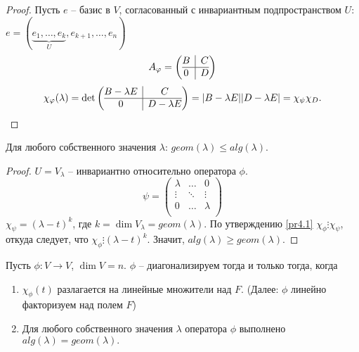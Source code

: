 \begin{proof}
    Пусть $e$ -- базис в $V$, согласованный с инвариантным подпространством $U$: 
    $e = (\underbrace{e_{1}, \dots, e_{k}}_{U}, e_{k + 1}, \dots, e_n)$
    \[A_{\phi} = \left(\begin{array}{@{}c|c@{}}
		B & C\\
		\hline
		0 & D
    \end{array}\right)\]
    \[\chi_{\phi}(\lambda) = \det \left(\begin{array}{@{}c|c@{}}
		B - \lambda E & C\\
		\hline
		0 & D - \lambda E
    \end{array}\right) = |B - \lambda E| |D - \lambda E| = \chi_{\psi} \chi_D.\]
\end{proof}

\begin{corollary}
    Для любого собственного значения $\lambda$: $geom(\lambda) \leq alg(\lambda)$.
\end{corollary}

\begin{proof}
    $U = V_{\lambda}$ -- инвариантно относительно оператора $\phi$.
    \begin{equation*}
    \psi =
        \left(
            \begin{array}{ccc}
            \lambda & \dots & 0 \\
            \vdots & \ddots & \vdots \\
            0 & \dots & \lambda \\
            \end{array}
        \right)
    \end{equation*}
    $\chi_{\psi} = (\lambda - t)^k$, где $k = \dim V_{\lambda} = geom(\lambda)$. 
    По утверждению \ref{pr4.1} $\chi_{\phi} \vdots \chi_{\psi}$, откуда следует, что 
    $\chi_{\phi} \vdots (\lambda - t)^k$. Значит, $alg(\lambda) \geq geom(\lambda)$.
\end{proof}

\begin{theorem}
    Пусть $\phi: V \to V$, $\dim V = n$. $\phi$ -- диагонализируем тогда и только тогда, когда 
    \begin{enumerate}
        \item $\chi_{\phi}(t)$ разлагается на линейные множители над $F$. (Далее: $\phi$ линейно факторизуем над полем $F$)
        \item Для любого собственного значения $\lambda$ оператора $\phi$ выполнено $alg(\lambda) = geom(\lambda).$
    \end{enumerate}
\end{theorem}

